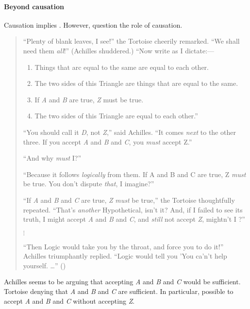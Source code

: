 \paragraph{Beyond causation}
\label{sec:motivating-ESU:beyond-causation}

\begin{note}
  Causation implies \ESU{}.
  However, question the role of causation.
\end{note}

\begin{note}
  \begin{quote}
    ``Plenty of blank leaves, I see!'' the Tortoise cheerily remarked.
    ``We shall need them \emph{all}!''
    (Achilles shuddered.)
    ``Now write as I dictate:---

    \begin{enumerate}[label=(\emph{\Alph*})]
    \item Things that arc equal to the same are equal to each other.
    \item The two sides of this Triangle are things that are equal to the same.
    \item If \emph{A} and \emph{B} are true, \emph{Z} must be true.
      \setcounter{enumi}{25}
    \item The two sides of this Triangle are equal to each other.''
    \end{enumerate}

    ``You should call it \emph{D}, not \emph{Z},'' said Achilles.
    ``It comes \emph{next} to the other three.
    If you accept \emph{A} and \emph{B} and \emph{C}, you \emph{must} accept Z.''

    ``And why \emph{must} I?''

    ``Because it follows \emph{logically} from them.
    If A and B and C are true, Z \emph{must} be true.
    You don't dispute \emph{that}, I imagine?''

    ``If \emph{A} and \emph{B} and \emph{C} are true, \emph{Z} \emph{must} be true,'' the Tortoise thoughtfully repeated.
    ``That's \emph{another} Hypothetical, isn't it?
    And, if I failed to see its truth, I might accept \emph{A} and \emph{B} and \emph{C}, and \emph{still} not accept \emph{Z}, mightn't I ?''

    \mbox{}\hfill\(\vdots\)\hfill\mbox{}

    ``Then Logic would take you by the throat, and force you to do it!''
    Achilles triumphantly replied. ``Logic would tell you 'You ca'n't help yourself.
    \dots''\nolinebreak
    \mbox{}\hfill\mbox{(\citeyear[279--280]{Carroll:1895uj})}
  \end{quote}
  Achilles seems to be arguing that accepting \emph{A} and \emph{B} and \emph{C} would be sufficient.
  Tortoise denying that \emph{A} and \emph{B} and \emph{C} are sufficient.
  In particular, possible to accept \emph{A} and \emph{B} and \emph{C} without accepting \emph{Z}.


\end{note}

